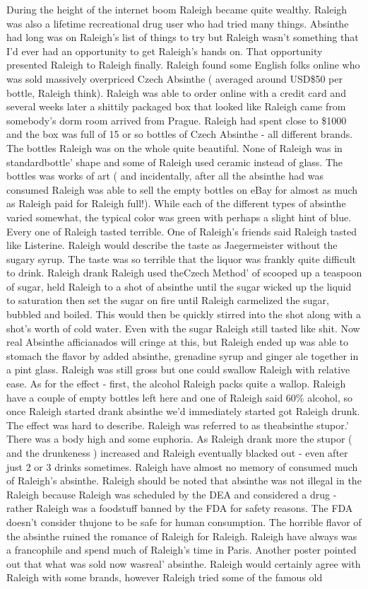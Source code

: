 \documentclass[12pt]{book}
\begin{document}
During the height of the internet boom Raleigh became quite wealthy. Raleigh was also a lifetime recreational drug user who had tried many things. Absinthe had long was on Raleigh's list of things to try but Raleigh wasn't something that I'd ever had an opportunity to get Raleigh's hands on. That opportunity presented Raleigh to Raleigh finally. Raleigh found some English folks online who was sold massively overpriced Czech Absinthe ( averaged around USD\$50 per bottle, Raleigh think). Raleigh was able to order online with a credit card and several weeks later a shittily packaged box that looked like Raleigh came from somebody's dorm room arrived from Prague. Raleigh had spent close to \$1000 and the box was full of 15 or so bottles of Czech Absinthe - all different brands. The bottles Raleigh was on the whole quite beautiful. None of Raleigh was in standardbottle' shape and some of Raleigh used ceramic instead of glass. The bottles was works of art ( and incidentally, after all the absinthe had was consumed Raleigh was able to sell the empty bottles on eBay for almost as much as Raleigh paid for Raleigh full!). While each of the different types of absinthe varied somewhat, the typical color was green with perhaps a slight hint of blue. Every one of Raleigh tasted terrible. One of Raleigh's friends said Raleigh tasted like Listerine. Raleigh would describe the taste as Jaegermeister without the sugary syrup. The taste was so terrible that the liquor was frankly quite difficult to drink. Raleigh drank Raleigh used theCzech Method' of scooped up a teaspoon of sugar, held Raleigh to a shot of absinthe until the sugar wicked up the liquid to saturation then set the sugar on fire until Raleigh carmelized the sugar, bubbled and boiled. This would then be quickly stirred into the shot along with a shot's worth of cold water. Even with the sugar Raleigh still tasted like shit. Now real Absinthe afficianados will cringe at this, but Raleigh ended up was able to stomach the flavor by added absinthe, grenadine syrup and ginger ale together in a pint glass. Raleigh was still gross but one could swallow Raleigh with relative ease. As for the effect - first, the alcohol Raleigh packs quite a wallop. Raleigh have a couple of empty bottles left here and one of Raleigh said 60\% alcohol, so once Raleigh started drank absinthe we'd immediately started got Raleigh drunk. The effect was hard to describe. Raleigh was referred to as theabsinthe stupor.' There was a body high and some euphoria. As Raleigh drank more the stupor ( and the drunkeness ) increased and Raleigh eventually blacked out - even after just 2 or 3 drinks sometimes. Raleigh have almost no memory of consumed much of Raleigh's absinthe. Raleigh should be noted that absinthe was not illegal in the Raleigh because Raleigh was scheduled by the DEA and considered a drug - rather Raleigh was a foodstuff banned by the FDA for safety reasons. The FDA doesn't consider thujone to be safe for human consumption. The horrible flavor of the absinthe ruined the romance of Raleigh for Raleigh. Raleigh have always was a francophile and spend much of Raleigh's time in Paris. Another poster pointed out that what was sold now wasreal' absinthe. Raleigh would certainly agree with Raleigh with some brands, however Raleigh tried some of the famous old 
\end{document}
